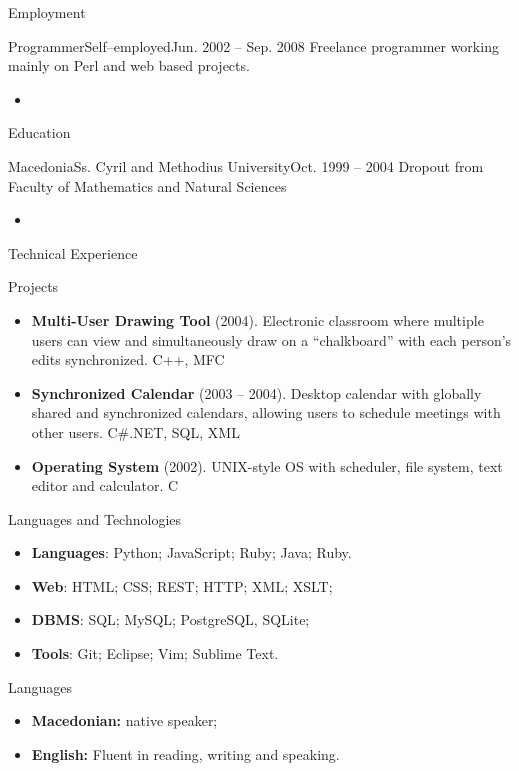 \documentclass[DIN Next]{mcdowellcv}
\begin{document}
\begin{cvsection}{Employment}
		\begin{cvsubsection}{Programmer}{Self--employed}{Jun. 2002 -- Sep. 2008}
            Freelance programmer working mainly on Perl and web based projects.
			\begin{itemize}
				\item
			\end{itemize}
		\end{cvsubsection}
	\end{cvsection}

	\begin{cvsection}{Education}
		\begin{cvsubsection}{Macedonia}{Ss. Cyril and Methodius University}{Oct. 1999 -- 2004}
			Dropout from Faculty of Mathematics and Natural Sciences
			\begin{itemize}
				\item
			\end{itemize}
		\end{cvsubsection}
	\end{cvsection}

	\begin{cvsection}{Technical Experience}
		\begin{cvsubsection}{Projects}{}{}
			\begin{itemize}
				\item \textbf{Multi-User Drawing Tool} (2004). Electronic classroom where multiple users can view and simultaneously draw on a “chalkboard” with each person’s edits synchronized.  C++, MFC
				\item \textbf{Synchronized Calendar} (2003 – 2004). Desktop calendar with globally shared and synchronized calendars, allowing users to schedule meetings with other users.  C\#.NET, SQL, XML
    				\item \textbf{Operating System} (2002).  UNIX-style OS with scheduler, file system, text editor and calculator. C
			\end{itemize}
		\end{cvsubsection}
	\end{cvsection}

	\begin{cvsection}{Languages and Technologies}
		\begin{cvsubsection}{}{}{}
			\begin{itemize}
				\item \textbf{Languages}: Python; JavaScript; Ruby; Java; Ruby.
				\item \textbf{Web}: HTML; CSS; REST; HTTP; XML; XSLT;
                \item \textbf{DBMS}: SQL; MySQL; PostgreSQL, SQLite;
                \item \textbf{Tools}: Git; Eclipse; Vim; Sublime Text.
			\end{itemize}
		\end{cvsubsection}
	\end{cvsection}

	\begin{cvsection}{Languages}
		\begin{cvsubsection}{}{}{}
			\begin{itemize}
				\item \textbf{Macedonian:} native speaker;
				\item \textbf{English:} Fluent in reading, writing and speaking.
			\end{itemize}
		\end{cvsubsection}
	\end{cvsection}
\end{document}
